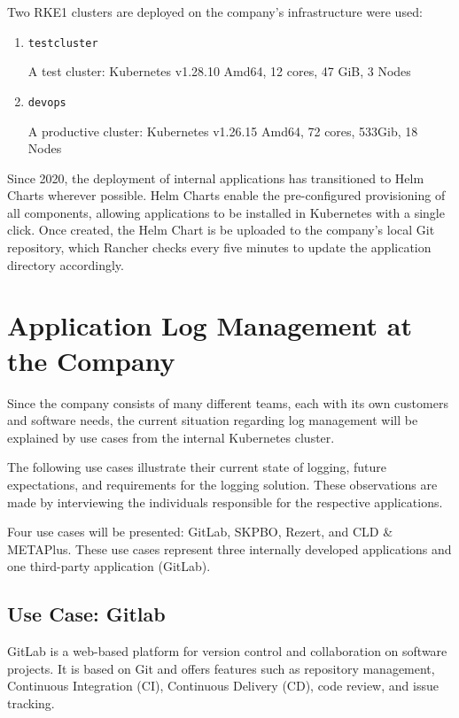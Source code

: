 \documentclass[../main.tex]{subfiles}
\begin{document}
Two RKE1 clusters are deployed on the company's infrastructure were used:

\begin{enumerate}
    \item[] \texttt{testcluster} 
    
    A test cluster: Kubernetes v1.28.10 Amd64, 12 cores, 47 GiB, 3 Nodes
    \item[] \texttt{devops} 
    
    A productive cluster: Kubernetes v1.26.15 Amd64, 72 cores, 533Gib, 18 Nodes
\end{enumerate}

Since 2020, the deployment of internal applications has transitioned to Helm Charts \cite{helm} wherever possible. Helm Charts enable the pre-configured provisioning of all components, allowing applications to be installed in Kubernetes with a single click. Once created, the Helm Chart is be uploaded to the company's local Git repository, which Rancher checks every five minutes to update the application directory accordingly.

\section{Application Log Management at the Company}

Since the company consists of many different teams, each with its own customers and software needs, the current situation regarding log management will be explained by use cases from the internal Kubernetes cluster.  

The following use cases illustrate their current state of logging, future expectations, and requirements for the logging solution. These observations are made by interviewing the individuals responsible for the respective applications. 

Four use cases will be presented: GitLab, SKPBO, Rezert, and CLD \& METAPlus. These use cases represent three internally developed applications and one third-party application (GitLab).

\subsection{Use Case: Gitlab}

GitLab is a web-based platform for version control and collaboration on software projects. It is based on Git and offers features such as repository management, Continuous Integration (CI), Continuous Delivery (CD), code review, and issue tracking. \cite{gitlab}
\end{document}
